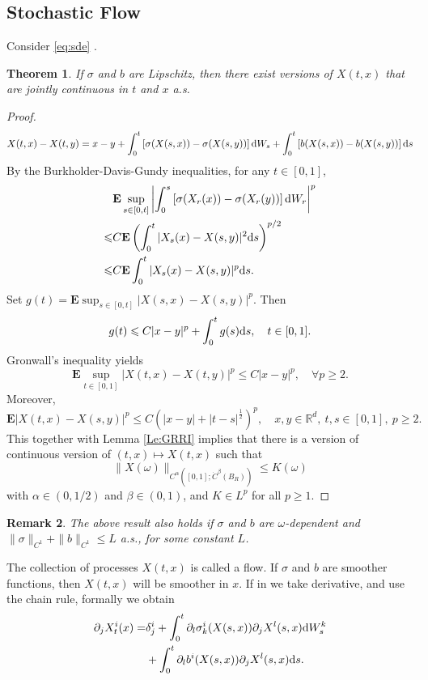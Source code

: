 \documentclass[twoside, 12pt]{book}
\numberwithin{equation}{chapter}
\newtheorem{theorem}{Theorem}[section]
\newtheorem{remark}[theorem]{Remark}
\def\mR{{\mathbb R}}
\def\bE{{\mathbf E}}
\def\l{\left}
\def\r{\right}
\def\geq{\geqslant}
\def\leq{\leqslant}
\def\d{\text{\rm{d}}}
\begin{document}
	\subsection{Stochastic Flow}

Consider \eqref{eq:sde}  .   \begin{theorem}\label{thm:flow1}
        If $\sigma$ and $b$ are Lipschitz, then there exist versions of $X(t,x)$ that are jointly continuous in $t$ and $x$ a.s.
    \end{theorem}
	\begin{proof}
	    \begin{align*}
	        X(t,x)-X(t,y)=x-y+\int_0^t \l[ \sigma(X(s,x))-\sigma(X(s,y))\r]\d W_s+ \int_0^t \l[b(X(s,x))-b(X(s,y))\r]\d s 
	    \end{align*}
     By the Burkholder-Davis-Gundy inequalities, for any $t\in[0,1]$, 
\begin{align*}
    &\bE \sup_{s\in [0,t]} \l| \int_0^s \l[\sigma(X_r(x))-\sigma(X_r(y))\r]\d W_r \r|^p\\
    \leq& C \bE \l(\int_0^t |X_{s}(x)-X(s,y)|^2 \d s \r)^{p/2}\\
    \leq & C \bE \int_0^t |X_{s}(x)-X(s,y)|^p \d s. 
\end{align*}
Set $g(t)=\bE \sup_{s\in [0,t]}|X(s,x)-X(s,y)|^p$. Then 
\[
    g(t)\leq C |x-y|^p+\int_0^t g(s) \d s, \quad t\in [0,1]. 
\]
Gronwall's inequality yields 
\[
    \bE \sup_{t\in[0,1]} \l|X(t,x)-X(t,y)\r|^p \leq C |x-y|^p, \quad \forall p\geq 2. 
\]
Moreover, 
\[
    \bE \l|X(t,x)-X(s,y)\r|^p\leq C \l(|x-y|+|t-s|^{\frac{1}{2}}\r)^p, \quad x,y\in \mR^d,~ t,s\in [0,1],~p\geq 2.
\]
This together with Lemma \ref{Le:GRRI} implies that there is a version of continuous version of $(t,x)\mapsto X(t,x)$ such that 
\[
    \|X(\omega)\|_{C^{\alpha}([0,1]; \dot C^\beta(B_R))} \leq K(\omega)
\]
with $\alpha\in (0,1/2)$ and $\beta\in(0,1)$, and $K\in L^p$ for all $p\geq 1$. 
	\end{proof}
 \begin{remark}
     The above result also holds if $\sigma$ and $b$ are $\omega$-dependent and $\|\sigma\|_{C^1}+\|b\|_{C^1}\leq L$ a.s., for some constant $L$. 
 \end{remark}
   The collection of processes $X(t,x)$ is called a flow. If $\sigma$ and $b$ are smoother functions, then $X(t,x)$ will be smoother in $x$.  If in  we take derivative, and use the chain rule, formally we obtain
    \[
        \begin{aligned}
            \partial_j X^i_t(x) = & \delta^i_j +\int_0^t \partial_l\sigma^i_k(X(s,x))  \partial_jX^l(s,x) \d W^k_s\\
            & +\int_0^t \partial_l b^i(X(s,x))\partial_j X^l(s,x) \d s .
        \end{aligned}
    \]
\end{document}
